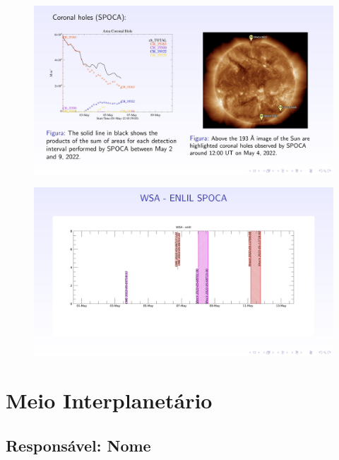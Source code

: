 \documentclass[a4paper, 10pt]{article}
\begin{document}
    \begin{figure}[H]
        \centering
        \includegraphics[width=14cm]{./figures/pt_outfileSun_0.jpg}
    \end{figure} 
 

    
    \begin{figure}[H]
        \centering
        \includegraphics[width=14cm]{./figures/pt_outfileSun_1.jpg}
    \end{figure} 
 

    \section{Meio Interplanetário} 
 \subsection{Responsável: Nome} 
 
\end{document}
